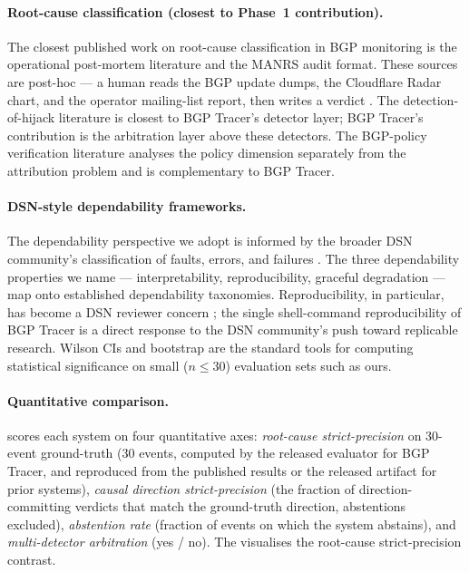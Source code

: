 \paragraph{Root-cause classification (closest to
Phase~1 contribution).} The closest published work
on root-cause classification in BGP monitoring is
the operational post-mortem literature
\cite{cloudflare-blog-2024,kentik-2025-blog,
apnic-2025-blog} and the MANRS audit format. These
sources are post-hoc --- a human reads the BGP
update dumps, the Cloudflare Radar chart, and the
operator mailing-list report, then writes a verdict
\cite{cloudflare-2018-datacenter,cloudflare-2020-outage}.
The detection-of-hijack literature
\cite{li-2018-prefixhijack,sharma-2019,
li-2019-bgp-security,feng-2019-bgphijack,
lukaseder-2018,preda-2019} is closest to BGP
Tracer's detector layer; BGP Tracer's contribution
is the arbitration layer above these detectors. The
BGP-policy verification literature
\cite{giotsas-2014-relaxed,edwards-2014-bgp-policy}
analyses the policy dimension separately from the
attribution problem and is complementary to BGP
Tracer.

\paragraph{DSN-style dependability frameworks.}
The dependability perspective we adopt is informed
by the broader DSN community's
classification of faults, errors, and failures
\cite{dsn-2023-best,dsn-2024-best,dsn-2025}. The
three dependability properties we name ---
interpretability, reproducibility, graceful
degradation --- map onto established dependability
taxonomies. Reproducibility, in particular, has
become a DSN reviewer concern
\cite{wilson-1927,efron-1979-bootstrap}; the single
shell-command reproducibility of BGP Tracer is a
direct response to the DSN community's push
toward replicable research. Wilson CIs
\cite{wilson-1927} and bootstrap
\cite{efron-bootstrap-book-1993} are the standard
tools for computing statistical significance on
small ($n \leq 30$) evaluation sets such as ours.

\paragraph{Quantitative comparison.}
 scores each system on four
quantitative axes: \emph{root-cause strict-precision}
on 30-event ground-truth (30 events, computed by the
released evaluator for BGP Tracer, and reproduced
from the published results or the released artifact
for prior systems), \emph{causal direction
strict-precision} (the fraction of
direction-committing verdicts that match the
ground-truth direction, abstentions excluded),
\emph{abstention rate} (fraction of events on which
the system abstains), and \emph{multi-detector
arbitration} (yes / no). The
 visualises the
root-cause strict-precision contrast.

